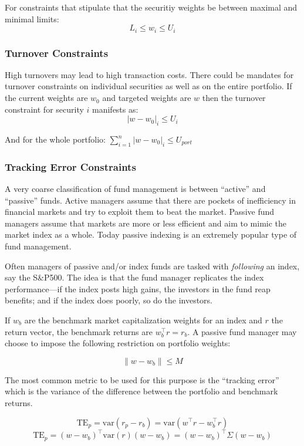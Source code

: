 \documentclass[11pt,]{article}
\begin{document}
For constraints that stipulate that the securitiy weights be between
maximal and minimal limits: \[L_i\leq w_i \leq U_i\]

\subsubsection{Turnover Constraints}\label{turnover-constraints}

High turnovers may lead to high transaction costs. There could be
mandates for turnover constraints on individual securities as well as on
the entire portfolio. If the current weights are \(w_0\) and targeted
weights are \(w\) then the turnover constraint for security \(i\)
manifests as: \[|w-w_0|_i\leq U_i\]

And for the whole portfolio: \(\sum_{i=1}^n |w-w_0|_i\leq U_{port}\)

\subsubsection{Tracking Error
Constraints}\label{tracking-error-constraints}

A very coarse classification of fund management is between ``active''
and ``passive'' funds. Active managers assume that there are pockets of
inefficiency in financial markets and try to exploit them to beat the
market. Passive fund managers assume that markets are more or less
efficient and aim to mimic the market index as a whole. Today passive
indexing is an extremely popular type of fund management.

Often managers of passive and/or index funds are tasked with
\emph{following} an index, say the S\&P500. The idea is that the fund
manager replicates the index performance---if the index posts high
gains, the investors in the fund reap benefits; and if the index does
poorly, so do the investors.

If \(w_b\) are the benchmark market capitalization weights for an index
and \(r\) the return vector, the benchmark returns are
\(w_b^{\top}r = r_b\). A passive fund manager may choose to impose the
following restriction on portfolio weights:

\[\|w-w_b\|\leq M\]

The most common metric to be used for this purpose is the ``tracking
error'' which is the variance of the difference between the portfolio
and benchmark returns.

\[\text{TE}_p = \text{var}(r_p-r_b)=\text{var}(w^{\top}r-w^{\top}_b r)\]
\[\text{TE}_p = (w-w_b)^{\top}\text{var}(r)(w-w_b)=(w-w_b)^{\top}\Sigma(w-w_b)\]
\end{document}
